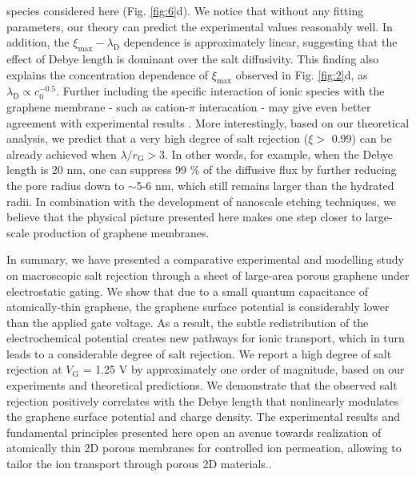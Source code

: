 \documentclass[journal=langd5,email=true, hyperref=true, keywords=false]{achemso}
\begin{document}
species considered here (Fig. \ref{fig:6}d). 
We notice that
without any fitting parameters, our theory can predict the
experimental values reasonably well.  In addition, the
$\xi_{\mathrm{max}}-\lambda_{\mathrm{D}}$ dependence is approximately
linear, suggesting that the effect of Debye length is dominant over
the salt diffusivity. This finding also explains the concentration
dependence of $\xi_{\mathrm{max}}$ observed in Fig. \ref{fig:2}d, as
$\lambda_{\mathrm{D}} \propto c_{0}^{-0.5}$. Further including the
specific interaction of ionic species with the graphene membrane
{- such as cation-$\pi$ interacation \cite{shi2013ion}} - may give even better agreement with experimental
results \cite{Ghosh_2018}. More interestingly, based on our theoretical analysis, we
predict that a very high degree of salt rejection ($\xi>$ 0.99) can be
already achieved when $\lambda / r_{\mathrm{G}}>$3. In other words,
for example, when the Debye length is 20 nm, one can suppress 99 \% of
the diffusive flux by further reducing the pore radius down to
$\sim$5-6 nm, which still remains larger than the hydrated radii. In
combination with the development of nanoscale etching techniques, we
believe that the physical picture presented here makes one step closer
to large-scale production of graphene membranes.

In summary, we have presented a comparative experimental and modelling
study on macroscopic salt rejection through a sheet of large-area
porous graphene under electrostatic gating. We show that due to a
small quantum capacitance of atomically-thin graphene, the graphene
surface potential is considerably lower than the applied gate
voltage. As a result, the subtle redistribution of the electrochemical
potential creates new pathways for ionic transport, which in turn
leads to a considerable degree of salt rejection. We report a high
degree of salt rejection at $V_{\mathrm{G}}$ = 1.25 V by approximately
one order of magnitude, based on our experiments and theoretical
predictions. We demonstrate that the observed salt
rejection positively correlates with the Debye length that nonlinearly
modulates the graphene surface potential and charge density. The
experimental results and fundamental principles presented here open an
avenue towards realization of atomically thin 2D porous membranes for
{ controlled ion permeation, allowing to tailor the ion transport through porous 2D materials.}.
\end{document}
